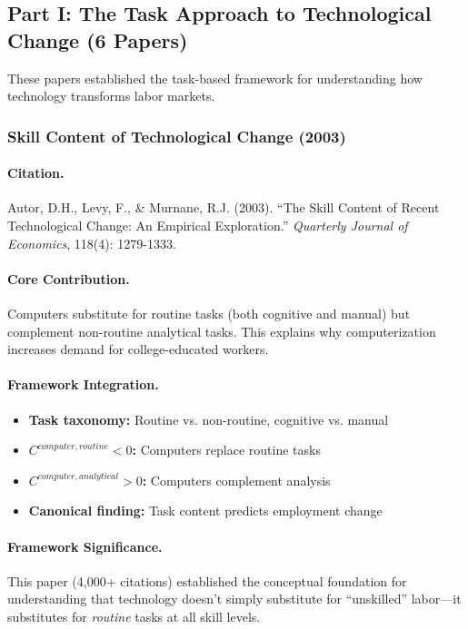 \subsection{Part I: The Task Approach to Technological Change (6 Papers)}

These papers established the task-based framework for understanding how
technology transforms labor markets.

\subsubsection{Skill Content of Technological Change (2003)}

\paragraph{Citation.}
Autor, D.H., Levy, F., \& Murnane, R.J. (2003). ``The Skill Content of Recent
Technological Change: An Empirical Exploration.''
\emph{Quarterly Journal of Economics}, 118(4): 1279-1333.

\paragraph{Core Contribution.}
Computers substitute for routine tasks (both cognitive and manual) but
complement non-routine analytical tasks. This explains why computerization
increases demand for college-educated workers.

\paragraph{Framework Integration.}
\begin{itemize}
  \item \textbf{Task taxonomy:} Routine vs. non-routine, cognitive vs. manual
  \item \textbf{$C^{computer,routine} < 0$:} Computers replace routine tasks
  \item \textbf{$C^{computer,analytical} > 0$:} Computers complement analysis
  \item \textbf{Canonical finding:} Task content predicts employment change
\end{itemize}

\paragraph{Framework Significance.}
This paper (4,000+ citations) established the conceptual foundation for
understanding that technology doesn't simply substitute for ``unskilled''
labor---it substitutes for \emph{routine} tasks at all skill levels.

